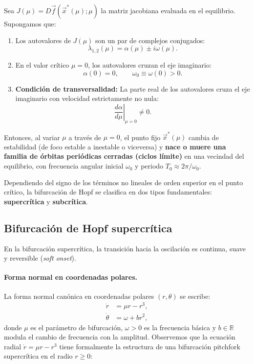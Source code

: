 \begin{theorem}
\label{thm:hopf_teorema}
Sea $J(\mu) = D\vec{f}(\vec{x}^*(\mu); \mu)$ la matriz jacobiana evaluada en el equilibrio. Supongamos que:
\begin{enumerate}
    \item Los autovalores de $J(\mu)$ son un par de complejos conjugados:
    \begin{equation}
        \lambda_{1,2}(\mu) = \alpha(\mu) \pm i\omega(\mu).
    \end{equation}
    \item En el valor crítico $\mu = 0$, los autovalores cruzan el eje imaginario:
    \begin{equation}
        \alpha(0) = 0, \qquad \omega_0 \equiv \omega(0) > 0.
    \end{equation}
    \item \textbf{Condición de transversalidad:} La parte real de los autovalores cruza el eje imaginario con velocidad estrictamente no nula:
    \begin{equation}
        \left. \frac{d\alpha}{d\mu} \right|_{\mu = 0} \neq 0.
    \end{equation}
\end{enumerate}
Entonces, al variar $\mu$ a través de $\mu = 0$, el punto fijo $\vec{x}^*(\mu)$ cambia de estabilidad (de foco estable a inestable o viceversa) y \textbf{nace o muere una familia de órbitas periódicas cerradas (ciclos límite)} en una vecindad del equilibrio, con frecuencia angular inicial $\omega_0$ y periodo $T_0 \approx 2\pi/\omega_0$.
\end{theorem}

Dependiendo del signo de los términos no lineales de orden superior en el punto crítico, la bifurcación de Hopf se clasifica en dos tipos fundamentales: \textbf{supercrítica} y \textbf{subcrítica}.

\subsection{Bifurcación de Hopf supercrítica}

En la bifurcación supercrítica, la transición hacia la oscilación es continua, suave y reversible (\emph{soft onset}).

\paragraph{Forma normal en coordenadas polares.}
La forma normal canónica en coordenadas polares $(r, \theta)$ se escribe:
\begin{align}
    \dot{r} &= \mu r - r^3, \label{eq:hopf_super_r} \\
    \dot{\theta} &= \omega + b r^2, \label{eq:hopf_super_theta}
\end{align}
donde $\mu$ es el parámetro de bifurcación, $\omega > 0$ es la frecuencia básica y $b \in \mathbb{R}$ modula el cambio de frecuencia con la amplitud. Observemos que la ecuación radial $\dot{r} = \mu r - r^3$ tiene formalmente la estructura de una bifurcación pitchfork supercrítica en el radio $r \ge 0$:


